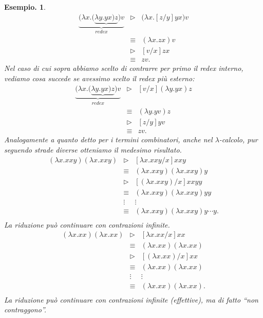 \documentclass{book}
\newtheorem{esempio}{Esempio.}
\newcommand*{\lbc}{$\lambda$-cal\-co\-lo}
\begin{document}
\begin{esempio}
\begin{equation}
\label{c6e4}
\begin{array}{lcl}
\underbrace{\bigl(\lambda x.(\underbrace{\lambda y.yx)z}\bigr)v}
_{redex} 
           & \vartriangleright & \bigl(\lambda x.[z/y]yx\bigr)v \\
           & \equiv            & (\lambda x.zx)v \\
           & \vartriangleright & [v/x]zx \\
	   & \equiv            & zv.
\end{array}
\end{equation}
Nel caso di cui sopra abbiamo scelto di contrarre per primo il redex interno,
vediamo cosa succede se avessimo scelto il redex pi\`u esterno:
\begin{equation}
\begin{array}{lcl}
\underbrace{\bigl(\lambda x.(\underbrace{\lambda y.yx)z}\bigr)v}
_{redex} 
           & \vartriangleright & [v/x](\lambda y.yx)z \\
           & \equiv & (\lambda y.yv)z \\
           & \vartriangleright & [z/y]yv \\
           & \equiv & zv.
\end{array}
\end{equation}
Analogamente a quanto detto per i termini combinatori, anche nel \lbc, pur
seguendo strade diverse otteniamo il medesimo risultato.
\begin{equation}
\label{c6e5}
\begin{array}{lcl}
(\lambda x.xxy)(\lambda x.xxy) 
    & \vartriangleright & [\lambda x.xxy/x]xxy \\
    & \equiv            & (\lambda x.xxy)(\lambda x.xxy)y \\
    & \vartriangleright & [(\lambda x.xxy)/x]xxyy \\
    & \equiv            & (\lambda x.xxy)(\lambda x.xxy)yy \\
    & \vdots            & \vdots \\
    & \equiv            & (\lambda x.xxy)(\lambda x.xxy)y\cdots y. \\
\end{array}
\end{equation}
La riduzione   pu\`o continuare con contrazioni infinite.
\begin{equation}
\label{c6e6}
\begin{array}{lcl}
(\lambda x.xx)(\lambda x.xx) 
    & \vartriangleright & [\lambda x.xx/x]xx \\
    & \equiv            & (\lambda x.xx)(\lambda x.xx) \\
    & \vartriangleright & [(\lambda x.xx)/x]xx \\
    & \equiv            & (\lambda x.xx)(\lambda x.xx) \\
    & \vdots            & \vdots \\
    & \equiv            & (\lambda x.xx)(\lambda x.xx). \\
\end{array}
\end{equation}
La riduzione   pu\`o continuare con contrazioni infinite (effettive), ma di
fatto ``non contraggono''.
\end{esempio}
\end{document}
